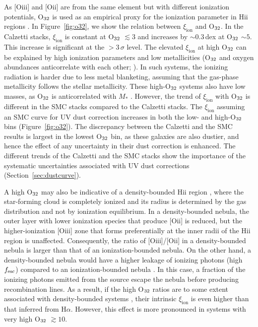 \documentclass[iop]{emulateapj}
\newcommand{\xiion}{\ensuremath{\xi_{\mathrm{ion}}}}
\newcommand{\halpha}{H\ensuremath{\alpha}}
\def\o32{{O$_{\rm 32}$}}
\begin{document}
As [O{\sc iii}] and [O{\sc ii}] are from the same element but with different ionization potentials, {\o32} is used as an empirical proxy for the ionization parameter in H{\sc ii} regions
 \citep{penston90,kewley02}. In Figure~\ref{fig:o32}, we show the relation between {\xiion} and {\o32}. In the Calzetti stacks, {\xiion} is constant at {\o32} $\lesssim 3$ and increases by $\sim 0.3$\,dex at {\o32} $\sim 5$. This increase is significant at the $> 3\,\sigma$ level.
The elevated {\xiion} at high {\o32} can be explained by high ionization parameters and low metallicities ({\o32} and oxygen abundances anticorrelate with each other; \citealt{jones15}). In such systems, the ionizing radiation is harder due to less metal blanketing, assuming that the gas-phase metallicity follows the stellar metallicity.
These high-{\o32} systems also have low masses, as {\o32} is anticorrelated with $M_*$ \citep[shown for the MOSDEF sample in][]{sanders16a}.
However, the trend of {\xiion} with {\o32} is different in the SMC stacks compared to the Calzetti stacks. The {\xiion} assuming an SMC curve for UV dust correction increases in both the low- and high-{\o32} bins (Figure~\ref{fig:o32}). The discrepancy between the Calzetti and the SMC results is largest in the lowest {\o32} bin, as these galaxies are also dustier, and hence the effect of any uncertainty in their dust correction is enhanced.
The different trends of the Calzetti and the SMC stacks show the importance of the systematic uncertainties associated with UV dust corrections (Section~\ref{sec:dustcurve}).

A high {\o32} may also be indicative of a density-bounded H{\sc ii} region \citep[see Figure 11 in][]{nakajima14,trainor16}, where the star-forming cloud is completely ionized and its radius is determined by the gas distribution and not by ionization equilibrium. 
In a density-bounded nebula, the outer layer with lower ionization species that produce [O{\sc ii}] is reduced, but the higher-ionization [O{\sc iii}] zone that forms preferentially at the inner radii of the H{\sc ii} region is unaffected.
Consequently, the ratio of [O{\sc iii}]/[O{\sc ii}] in a density-bounded nebula is larger than that of an ionization-bounded nebula.
On the other hand, a density-bounded nebula would have a higher leakage of ionizing photons (high $f_{\rm esc}$) compared to an ionization-bounded nebula \citep[see][]{giammanco05,jaskot13,nakajima14}. In this case, a fraction of the ionizing photons emitted from the source escape the nebula before producing recombination lines. 
As a result, if the high {\o32} ratios are to some extent associated with density-bounded systems \citep[see Figure 11 in][]{nakajima14}, their intrinsic {\xiion} is even higher than that inferred from {\halpha}. However, this effect is more pronounced in systems with very high {\o32} $\gtrsim 10$.
\end{document}
